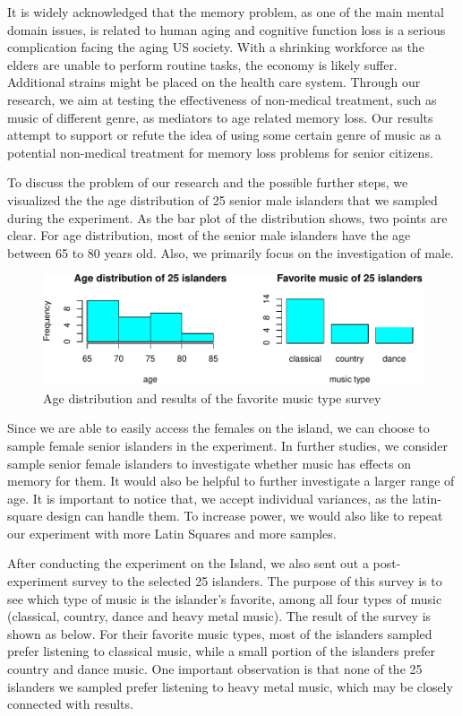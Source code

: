 \documentclass[]{article}
\begin{document}
It is widely acknowledged that the memory problem, as one of the main
mental domain issues, is related to human aging and cognitive function
loss is a serious complication facing the aging US society. With a
shrinking workforce as the elders are unable to perform routine tasks,
the economy is likely suffer. Additional strains might be placed on the
health care system. Through our research, we aim at testing the
effectiveness of non-medical treatment, such as music of different
genre, as mediators to age related memory loss. Our results attempt to
support or refute the idea of using some certain genre of music as a
potential non-medical treatment for memory loss problems for senior
citizens.

To discuss the problem of our research and the possible further steps,
we visualized the the age distribution of 25 senior male islanders that
we sampled during the experiment. As the bar plot of the distribution
shows, two points are clear. For age distribution, most of the senior
male islanders have the age between 65 to 80 years old. Also, we
primarily focus on the investigation of male.

\begin{figure}
\centering
\includegraphics{music_memory_files/figure-latex/unnamed-chunk-9-1.pdf}
\caption{Age distribution and results of the favorite music type survey}
\end{figure}

Since we are able to easily access the females on the island, we can
choose to sample female senior islanders in the experiment. In further
studies, we consider sample senior female islanders to investigate
whether music has effects on memory for them. It would also be helpful
to further investigate a larger range of age. It is important to notice
that, we accept individual variances, as the latin-square design can
handle them. To increase power, we would also like to repeat our
experiment with more Latin Squares and more samples.

After conducting the experiment on the Island, we also sent out a
post-experiment survey to the selected 25 islanders. The purpose of this
survey is to see which type of music is the islander's favorite, among
all four types of music (classical, country, dance and heavy metal
music). The result of the survey is shown as below. For their favorite
music types, most of the islanders sampled prefer listening to classical
music, while a small portion of the islanders prefer country and dance
music. One important observation is that none of the 25 islanders we
sampled prefer listening to heavy metal music, which may be closely
connected with results.
\end{document}
